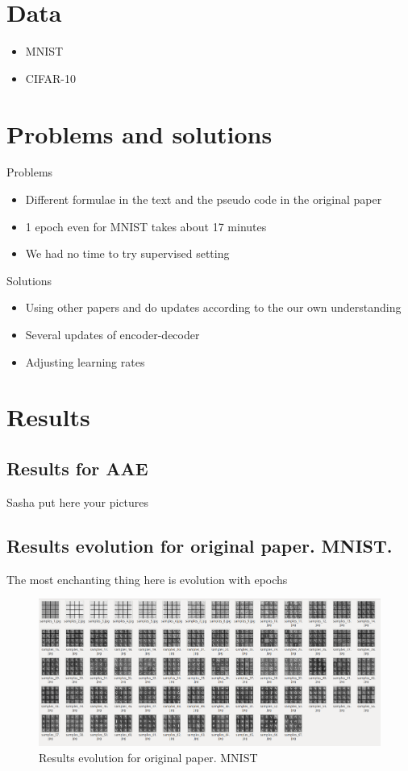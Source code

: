 \documentclass{article}
\begin{document}
    \section{Data}

    \begin{itemize}
        \item MNIST
        \item CIFAR-10
    \end{itemize}


    \section{Problems and solutions}

    Problems
    \begin{itemize}
        \item Different formulae in the text and the pseudo code in the original paper
        \item 1 epoch even for MNIST takes about 17 minutes
        \item We had no time to try supervised setting
    \end{itemize}
    Solutions
    \begin{itemize}
        \item Using other papers and do updates according to the our own understanding
        \item Several updates of encoder-decoder
        \item Adjusting learning rates
    \end{itemize}


    \section{Results}

    \subsection{Results for AAE}
    Sasha put here your pictures

    \subsection{Results evolution for original paper. MNIST.}
    The most enchanting thing here is evolution with epochs
    \begin{figure}[!h]
        \includegraphics[width=\textwidth]{figures/MNIST-original-evolution.png}
        \caption{Results evolution for original paper. MNIST}
    \end{figure}
\end{document}
